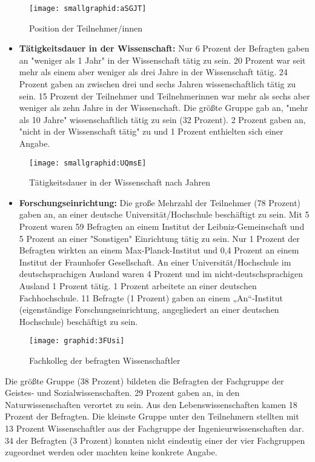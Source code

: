 \begin{figure}[h!]
\texttt{[image: smallgraphid:aSGJT]}
\caption{Position der Teilnehmer/innen}
\end{figure}

\begin{itemize}
\item \textbf{Tätigkeitsdauer in der Wissenschaft:} Nur 6 Prozent der Befragten gaben an "weniger als 1 Jahr" in der Wissenschaft tätig zu sein. 20 Prozent war seit mehr als einem aber weniger als drei Jahre in der Wissenschaft tätig. 24 Prozent gaben an zwischen drei und sechs Jahren wissenschaftlich tätig zu sein. 15 Prozent der Teilnehmer und Teilnehmerinnen war mehr als sechs aber weniger als zehn Jahre in der Wissenschaft. Die größte Gruppe gab an, "mehr als 10 Jahre" wissenschaftlich tätig zu sein (32 Prozent). 2 Prozent gaben an, "nicht in der Wissenschaft tätig" zu und 1 Prozent enthielten sich einer Angabe.
\end{itemize}

\begin{figure}[h!]
\texttt{[image: smallgraphid:UQmsE]}
\caption{Tätigkeitsdauer in der Wissenschaft nach Jahren}
\end{figure}

\begin{itemize}
\item \textbf{Forschungseinrichtung:} Die große Mehrzahl der Teilnehmer (78 Prozent) gaben an, an einer deutsche Universität/Hochschule beschäftigt zu sein. Mit 5 Prozent waren 59 Befragten an einem Institut der Leibniz-Gemeinschaft und 5 Prozent an einer "Sonstigen" Einrichtung tätig zu sein. Nur 1 Prozent der Befragten wirkten an einem Max-Planck-Institut und 0,4 Prozent an einem Institut der Fraunhofer Gesellschaft. An einer Universität/Hochschule im deutschsprachigen Ausland waren 4 Prozent und im nicht-deutschsprachigen Ausland 1 Prozent tätig. 1 Prozent arbeitete an einer deutschen Fachhochschule. 11 Befragte (1 Prozent) gaben an einem „An“-Institut (eigenständige Forschungseinrichtung, angegliedert an einer deutschen Hochschule) beschäftigt zu sein.
\end{itemize}

\begin{figure}[h!]
\texttt{[image: graphid:3FUsi]}
\caption{Fachkolleg der befragten Wissenschaftler}
\end{figure}

Die größte Gruppe (38 Prozent) bildeten die Befragten der Fachgruppe der Geistes- und Sozialwissenschaften. 29 Prozent gaben an, in den Naturwissenschaften verortet zu sein. Aus den Lebenswissenschaften kamen 18 Prozent der Befragten. Die kleinste Gruppe unter den Teilnehmern stellten mit 13 Prozent Wissenschaftler aus der Fachgruppe der Ingenieurwissenschaften dar. 34 der Befragten (3 Prozent) konnten nicht eindeutig einer der vier Fachgruppen zugeordnet werden oder machten keine konkrete Angabe.

